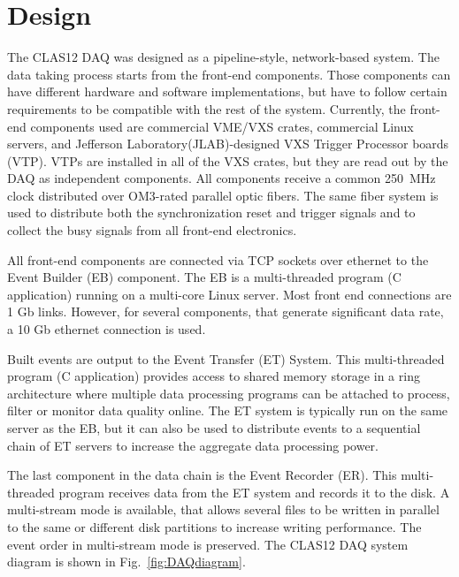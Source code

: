 \section{Design}

The CLAS12 DAQ was designed as a pipeline-style, network-based system. The data taking process starts from the front-end components. Those components can have different hardware and software implementations, but have to follow certain requirements to be compatible with the rest of the system. Currently, the front-end components used are commercial VME/VXS crates, commercial Linux servers, and Jefferson Laboratory(JLAB)-designed VXS Trigger Processor boards (VTP). VTPs are installed in all of the VXS crates, but they are read out by the DAQ as independent components. All components receive a common 250~MHz clock distributed over OM3-rated parallel optic fibers. The same fiber system is used to distribute both the synchronization reset and trigger signals and to collect the busy signals from all front-end electronics.

All front-end components are connected via TCP sockets over ethernet to the Event Builder (EB) component. The EB is a multi-threaded program (C application) running on a multi-core Linux server. Most front end connections are 1 Gb links. However, for several components, that generate significant data rate, a 10 Gb ethernet connection is used.

Built events are output to the Event Transfer (ET) System. This multi-threaded program (C application) provides access to shared memory storage in a ring architecture where multiple data processing programs can be attached to process, filter or monitor data quality online. The ET system is typically run on the same server as the EB, but it can also be used to distribute events to a sequential chain of ET servers to increase the aggregate data processing power.

The last component in the data chain is the Event Recorder (ER). This multi-threaded program receives data from the ET system and records it to the disk. A multi-stream mode is available, that allows several files to be written in parallel to the same or different disk partitions to increase writing performance. The event order in multi-stream mode is preserved. The CLAS12 DAQ system diagram is shown in Fig.~\ref{fig:DAQdiagram}.

